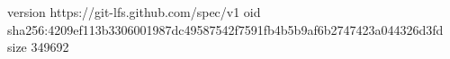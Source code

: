 version https://git-lfs.github.com/spec/v1
oid sha256:4209ef113b3306001987dc49587542f7591fb4b5b9af6b2747423a044326d3fd
size 349692

